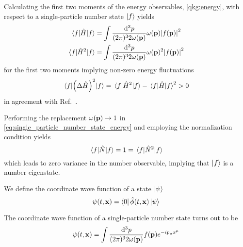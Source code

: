 \begin{lemma}
	Calculating the first two moments of the energy observables, \cref{qkg:energy}, with respect to a single-particle number state $\ket{f}$ yields
	\begin{align}
		\expval{\hat{H}}{f}
		&=
		\int\frac{\dd[3]{p}}{(2\pi)^32\omega(\vb{p})}
		\omega(\vb{p})
		\abs{f(\vb{p})}^2
		\\
		\expval{\hat{H}^2}{f}
		&=
		\int\frac{\dd[3]{p}}{(2\pi)^32\omega(\vb{p})}
		\omega(\vb{p})^2
		\abs{f(\vb{p})}^2
		\label{eq:single_particle_number_state_energy}
	\end{align}
	for the first two moments implying non-zero energy fluctuations
	\begin{equation}
		\expval{\left(\Delta\hat{H}\right)^2}{f}
		=
		\expval{\hat{H}^2}{f}
		-
		\expval{\hat{H}}{f}^2
		>
		0
	\end{equation}
	in agreement with Ref.~\cite[eqs.~10 and 11]{Naumov2013}.
\end{lemma}

\begin{corollary}
	Performing the replacement $\omega(\vb{p})\to1$ in \cref{eq:single_particle_number_state_energy} and employing the normalization condition yields
	\begin{equation}
		\expval{\hat{N}}{f}
		=
		1
		=
		\expval{\hat{N}^2}{f}
	\end{equation}
	which leads to zero variance in the number observable, implying that $\ket{f}$ is a number eigenstate.
\end{corollary}

\begin{definition}
	We define the coordinate wave function of a state $\ket{\psi}$
	\begin{equation}
		\psi(t,\vb{x})
		=
		\bra{0}\hat\phi(t,\vb{x})\ket{\psi}
	\end{equation}
\end{definition}
\begin{example}
	The coordinate wave function of a single-particle number state turns out to be
	\begin{equation}
		\psi(t,\vb{x})
		=
		\int\frac{\dd[3]{p}}{(2\pi)^32\omega(\vb{p})}
		f(\vb{p})e^{-ip_\mu x^\mu}
	\end{equation}
\end{example}

